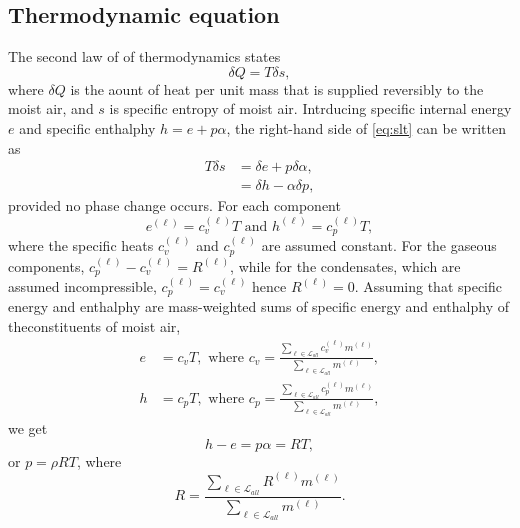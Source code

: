 \documentclass{agujournal}
\begin{document}
{\subsection{Thermodynamic equation}\label{sec:teqn}
The second law of of thermodynamics states
\begin{equation}
\delta Q=T\delta s,\label{eq:slt}
\end{equation}
where $\delta Q$ is the aount of heat per unit mass that is supplied reversibly to the moist air, and $s$ is specific entropy of moist air. Intrducing specific internal energy $e$ and specific enthalphy $h=e+p\alpha$, the right-hand side of \eqref{eq:slt} can be written as
\begin{align}
T\delta s &=\delta e+p\delta \alpha,\\
          &=\delta h-\alpha \delta p,
\end{align}
provided no phase change occurs. For each component
\begin{equation}
e^{(\ell)}=c^{(\ell)}_vT \text{ and } h^{(\ell)}=c^{(\ell)}_pT,
\end{equation}
where the specific heats $c_v^{(\ell)}$ and $c_p^{(\ell)}$ are assumed constant. For the gaseous components, $c_p^{(\ell)}-c_v^{(\ell)}=R^{(\ell)}$, while for the condensates, which are assumed incompressible, $c_p^{(\ell)}=c_v^{(\ell)}$ hence $R^{(\ell)}=0$. Assuming that specific energy and enthalphy are mass-weighted sums of specific energy and enthalphy of theconstituents of moist air,
\begin{align}
e&=c_vT, \text{ where } c_v=\frac{\sum_{\ell \in \mathcal{L}_{all}} c_v^{(\ell)}m^{(\ell)}}{\sum_{\ell \in \mathcal{L}_{all}} m^{(\ell)}},\\
h&=c_pT, \text{ where } c_p=\frac{\sum_{\ell \in \mathcal{L}_{all}} c_p^{(\ell)}m^{(\ell)}}{\sum_{\ell \in \mathcal{L}_{all}} m^{(\ell)}},
\end{align}
we get
\begin{equation}
h-e=p\alpha=RT,
\end{equation}
or $p=\rho RT$, where
\begin{equation}
R  =\frac{\sum_{\ell \in \mathcal{L}_{all}} R^{(\ell)} m^{(\ell)}}{\sum_{\ell \in \mathcal{L}_{all}} m^{(\ell)}}.
\end{equation}

}
\end{document}
